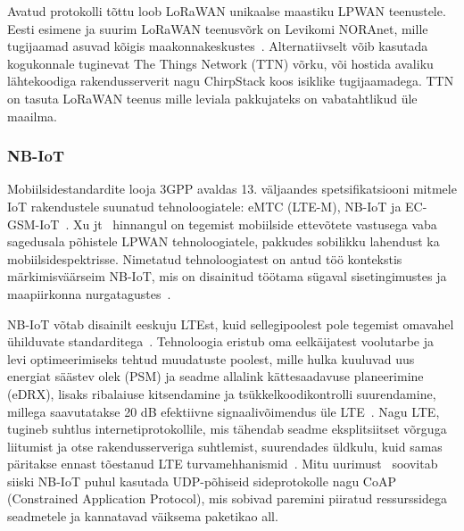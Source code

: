 \documentclass[12pt]{article}
\begin{document}
Avatud protokolli tõttu loob LoRaWAN unikaalse maastiku LPWAN teenustele.
Eesti esimene ja suurim LoRaWAN teenusvõrk on Levikomi NORAnet, mille tugijaamad asuvad kõigis maakonnakeskustes~\cite{noranetuudis}.
Alternatiivselt võib kasutada kogukonnale tuginevat The Things Network (TTN) võrku, või hostida avaliku lähtekoodiga rakendusserverit nagu ChirpStack koos isiklike tugijaamadega.
TTN on tasuta LoRaWAN teenus mille leviala pakkujateks on vabatahtlikud üle maailma.

\subsubsection{NB-IoT}

Mobiilsidestandardite looja 3GPP avaldas 13. väljaandes spetsifikatsiooni mitmele IoT rakendustele suunatud tehnoloogiatele: eMTC (LTE-M), NB-IoT ja EC-GSM-IoT~\cite{3gppiot}.
Xu jt~\cite{xuyao} hinnangul on tegemist mobiilside ettevõtete vastusega vaba sagedusala põhistele  LPWAN tehnoloogiatele, pakkudes sobilikku lahendust ka mobiilsidespektrisse.
Nimetatud tehnoloogiatest on antud töö kontekstis märkimisväärseim NB-IoT, mis on disainitud töötama sügaval sisetingimustes ja maapiirkonna nurgatagustes~\cite{martinez}.

NB-IoT võtab disainilt eeskuju LTEst, kuid sellegipoolest pole tegemist omavahel ühilduvate standarditega~\cite{wanglin}.
Tehnoloogia eristub oma eelkäijatest voolutarbe ja levi optimeerimiseks tehtud muudatuste poolest, mille hulka kuuluvad uus energiat säästev olek (PSM) ja seadme allalink kättesaadavuse planeerimine (eDRX), lisaks ribalaiuse kitsendamine ja tsükkelkoodikontrolli suurendamine, millega saavutatakse 20 dB efektiivne signaalivõimendus üle LTE~\cite{xuyao}.
Nagu LTE, tugineb suhtlus internetiprotokollile, mis tähendab seadme eksplitsiitset võrguga liitumist ja otse rakendusserveriga suhtlemist, suurendades üldkulu, kuid samas päritakse ennast tõestanud LTE turvamehhanismid~\cite{basu}.
Mitu uurimust~\cite{wirges, larmo} soovitab siiski NB-IoT puhul kasutada UDP-põhiseid sideprotokolle nagu CoAP (Constrained Application Protocol), mis sobivad paremini piiratud ressurssidega seadmetele ja kannatavad väiksema paketikao all.
\end{document}
